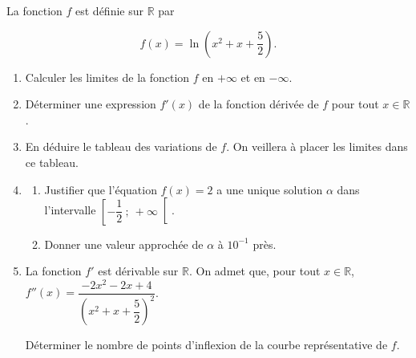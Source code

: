 \documentclass[10pt]{article}
\providecommand{\R}{\mathbb{R}}
\begin{document}
\medskip

La fonction $f$ est définie sur $\R$ par 

\[f(x) = \ln \left(x^2 + x + \dfrac{5}{2}\right).\]

\medskip

\begin{enumerate}
\item Calculer les limites de la fonction $f$ en $+\infty$ et en $-\infty$.
\item Déterminer une expression $f'(x)$ de la fonction dérivée de $f$ pour tout $x \in \R$.
\item En déduire le tableau des variations de $f$. On veillera à placer les limites dans ce tableau.
\item 
	\begin{enumerate}
		\item Justifier que l'équation $f(x) = 2$ a une unique solution $\alpha$ dans l'intervalle $\left[-\dfrac{1}{2}~;~+ \infty\right[$. 
		\item Donner une valeur approchée de $\alpha$ à $10^{-1}$ près.
 	\end{enumerate}
\item La fonction $f'$ est dérivable sur $\R$. On admet que, pour tout $x \in  \R$,\,  $f''(x) = \dfrac{-2x^2 - 2x + 4}{\left(x^2 + x + \dfrac{5}{2}\right)^2}$.

Déterminer le nombre de points d'inflexion de la courbe représentative de $f$.
\end{enumerate}

\bigskip
\end{document}
